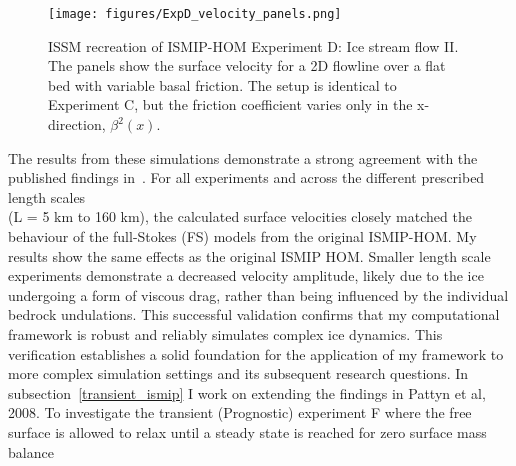 \begin{figure}[H]
    \texttt{[image: figures/ExpD\_velocity\_panels.png]}
    \caption{ ISSM recreation of ISMIP-HOM Experiment D: Ice stream flow II. The panels show the surface velocity for a 2D flowline over a flat bed with variable basal friction. The setup is identical to Experiment C, but the friction coefficient varies only in the x-direction, $\beta^{2}(x)$.}
    \label{fig:4.4}
\end{figure}
The results from these simulations demonstrate a strong agreement with the published findings in~\cite{Pattyn_2008}. For all experiments and across the different prescribed length scales \\(L = 5 km to 160 km), the calculated surface velocities closely matched the behaviour of the full-Stokes (FS) models from the original ISMIP-HOM.
My results show the same effects as the original ISMIP HOM. Smaller length scale experiments demonstrate a decreased velocity amplitude, likely due to the ice undergoing a form of viscous drag, rather than being influenced by the individual bedrock undulations. This successful validation confirms that my computational framework is robust and reliably simulates complex ice dynamics. This verification establishes a solid foundation for the application of my framework to more complex simulation settings and its subsequent research questions. In subsection~\ref{transient_ismip} I work on extending the findings in Pattyn et al, 2008. To investigate the transient (Prognostic) experiment F where the free surface is allowed to relax until a steady state is reached for zero surface mass balance~\cite{Pattyn_2008}


